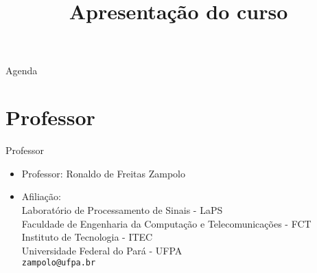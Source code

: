 


\title{\cursogrande\\ \vspace{1cm}Apresentação do curso}


   \maketitle[randomdots={false}]
   \begin{slide}{Agenda}
      \tableofcontents[content=sections]
   \end{slide}

   \section[ slide = true]{Professor }
      \begin{slide}[toc=]{Professor}
         \begin{itemize}
            \item Professor: Ronaldo de Freitas Zampolo
            \item Afiliação:\\
                  Laboratório de Processamento de Sinais - LaPS\\
                  Faculdade de Engenharia da Computação e Telecomunicações - FCT\\
                  Instituto de Tecnologia - ITEC\\
                  Universidade Federal do Pará - UFPA\\
                  \texttt{zampolo@ufpa.br}\\ 
         \end{itemize}
      \end{slide}
      

